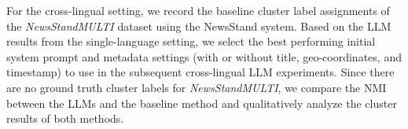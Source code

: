 For the cross-lingual setting, we record the baseline cluster label assignments of the \emph{NewsStandMULTI} dataset using the NewsStand system.
Based on the LLM results from the single-language setting, we select the best performing initial system prompt and metadata settings (with or without title, geo-coordinates, and timestamp) to use in the subsequent cross-lingual LLM experiments.
Since there are no ground truth cluster labels for \emph{NewsStandMULTI}, we compare the \ac{NMI} between the LLMs and the baseline method and qualitatively analyze the cluster results of both methods.





